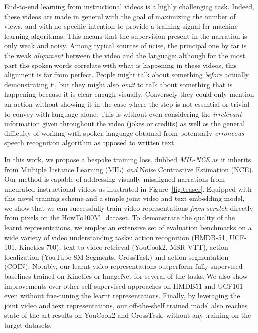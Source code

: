 \documentclass[10pt,twocolumn,letterpaper]{article}
\begin{document}
End-to-end learning from instructional videos is a highly challenging task.
Indeed, these videos are made in general with the goal of maximizing the number of views, and with no specific intention to provide a training signal for machine learning algorithms.
This means that the supervision present in the narration is only weak and noisy.
Among typical sources of noise, the principal one by far is the weak {\em alignment} between the video and the language: although for the most part the spoken words correlate with what is happening in these videos, this alignment is far from perfect.
People might talk about something \emph{before} actually demonstrating it, but they might also \emph{omit} to talk about something that is happening because it is clear enough visually.
Conversely they could only mention an action without showing it in the case where the step is not essential or trivial to convey with language alone.
This is without even considering the {\em irrelevant} information given throughout the video (\eg jokes or credits) as well as the general difficulty of working with spoken language obtained from potentially \emph{erroneous} speech recognition algorithm as opposed to written text.


In this work, we propose a bespoke training loss, dubbed \emph{MIL-NCE} as it inherits from Multiple Instance Learning (MIL) \emph{and} Noise Contrastive Estimation (NCE).
Our method is capable of addressing visually misaligned narrations from uncurated instructional videos as illustrated in Figure~\ref{fig:teaser}.
Equipped with this novel training scheme and a simple joint video and text embedding model, we show that we can successfully train video representations \emph{from scratch} directly from pixels on the HowTo100M~\cite{miech19howto100m} dataset.
To demonstrate the quality of the learnt representations, we employ an extensive set of evaluation benchmarks on a wide variety of video understanding tasks: action recognition (HMDB-51, UCF-101, Kinetics-700), text-to-video retrieval (YouCook2, MSR-VTT), action localization (YouTube-8M Segments, CrossTask) and action segmentation (COIN).
Notably, our learnt video representations outperform fully supervised baselines trained on Kinetics or ImageNet for several of the tasks.
We also show improvements over other self-supervised approaches on HMDB51 and UCF101 even without fine-tuning the learnt representations.
Finally, by leveraging the joint video and text representations, our off-the-shelf trained model also reaches state-of-the-art results on YouCook2 and CrossTask, without any training on the target datasets.
\end{document}
